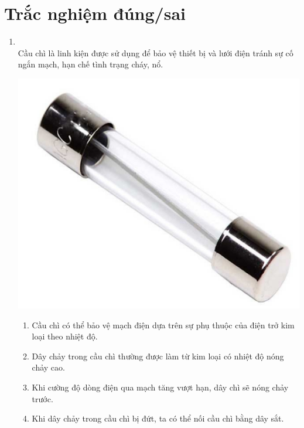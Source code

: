 \section{Trắc nghiệm đúng/sai}
\begin{enumerate}[label=\bfseries Câu \arabic*:, leftmargin=1.7cm]
	\item {}\\
	Cầu chì là linh kiện được sử dụng để bảo vệ thiết bị và lưới điện tránh sự cố ngắn mạch, hạn chế tình trạng cháy, nổ.
	\begin{center}
		\includegraphics[width=0.25\linewidth]{../figs/VN12-Y24-PH-SYL-007P-1}
	\end{center}
	\begin{enumerate}[label=\alph*)]
		\item Cầu chì có thể bảo vệ mạch điện dựa trên sự phụ thuộc của điện trở kim loại theo nhiệt độ.
		\item Dây chảy trong cầu chì thường được làm từ kim loại có nhiệt độ nóng chảy cao.
		\item Khi cường độ dòng điện qua mạch tăng vượt hạn, dây chì sẽ nóng chảy trước.
		\item Khi dây chảy trong cầu chì bị đứt, ta có thể nối cầu chì bằng dây sắt.
	\end{enumerate}
\end{enumerate}
